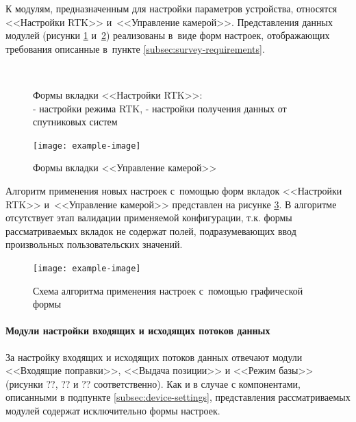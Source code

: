 К модулям, предназначенным для настройки параметров устройства, относятся <<Настройки RTK>> и~<<Управление камерой>>. Представления данных модулей (рисунки \ref{fig:rtk-settings} и~\ref{fig:camera-control}) реализованы в~виде форм настроек, отображающих требования описанные в~пункте \ref{subsec:survey-requirements}.

\begin{figure}[h!]
  \centering
  \setlength{\fboxsep}{5pt}
  \\
  \vspace*{6pt}
  \caption{
    Формы вкладки <<Настройки RTK>>:\\
    \protect{} - настройки режима RTK,
    \protect{} - настройки получения данных от спутниковых систем
  }
  \label{fig:rtk-settings}
\end{figure}

\begin{figure}[h!]
  \centering
  \setlength{\fboxsep}{5pt}
  \texttt{[image: example-image]}
  \vspace*{6pt}
  \caption{Формы вкладки <<Управление камерой>>}
  \label{fig:camera-control}
\end{figure}

Алгоритм применения новых настроек с~помощью форм вкладок <<Настройки RTK>> и~<<Управление камерой>> представлен на рисунке \ref{fig:basic-form-apply}. В алгоритме отсутствует этап валидации применяемой конфигурации, т.к. формы рассматриваемых вкладок не содержат полей, подразумевающих ввод произвольных пользовательских значений.

\begin{figure}[h!]
  \centering
  \setlength{\fboxsep}{5pt}
  \texttt{[image: example-image]}
  \vspace*{6pt}
  \caption{Схема алгоритма применения настроек с~помощью графической формы}
  \label{fig:basic-form-apply}
\end{figure}

\paragraph{Модули настройки входящих и исходящих потоков данных}

За настройку входящих и исходящих потоков данных отвечают модули <<Входящие поправки>>, <<Выдача позиции>> и <<Режим базы>> (рисунки ??, ?? и ?? соответственно). Как и в случае с компонентами, описанными в подпункте \ref{subsec:device-settings}, представления рассматриваемых модулей содержат исключительно формы настроек.

